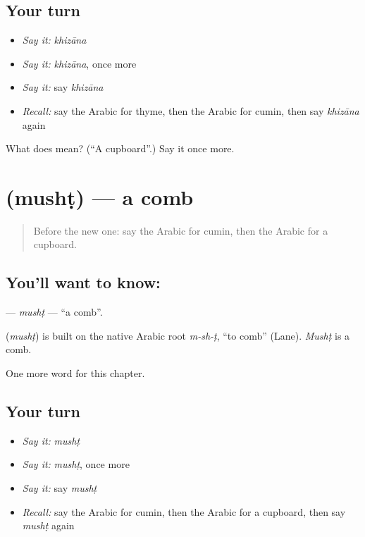 \subsection*{Your turn}
\begin{itemize}
\raggedright
  \item \emph{Say it:} \emph{khizāna}
  \item \emph{Say it:} \emph{khizāna}, once more
  \item \emph{Say it:} say \emph{khizāna}
  \item \emph{Recall:} say the Arabic for thyme, then the Arabic for cumin, then say \emph{khizāna} again
\end{itemize}

\begin{tcolorbox}[breakable,colback=teal!4,colframe=teal!35!black,title={Before you move on}]
What does  mean? (\textquotedblleft{}A cupboard\textquotedblright{}.) Say it once more.
\end{tcolorbox}
\section[\texorpdfstring{\ar{مشط} (mushṭ)}{مشط (mushṭ)}]{ (mushṭ) — a comb}

\label{lesson:AR-C122-musht}



\begin{quote}
Before the new one: say the Arabic for cumin, then the Arabic for a cupboard.
\end{quote}

\subsection*{You'll want to know: }
\textbf{} — \emph{mushṭ} — \textquotedblleft{}a comb\textquotedblright{}.

\begin{cousinweb}
\textbf{} (\emph{mushṭ}) is built on the native Arabic root \emph{m-sh-ṭ}, \textquotedblleft{}to comb\textquotedblright{} (Lane). \emph{Mushṭ} is a comb.
\end{cousinweb}

\begin{grammarlens}[title={What you've built}]
One more word for this chapter.
\end{grammarlens}

\subsection*{Your turn}
\begin{itemize}
\raggedright
  \item \emph{Say it:} \emph{mushṭ}
  \item \emph{Say it:} \emph{mushṭ}, once more
  \item \emph{Say it:} say \emph{mushṭ}
  \item \emph{Recall:} say the Arabic for cumin, then the Arabic for a cupboard, then say \emph{mushṭ} again
\end{itemize}

